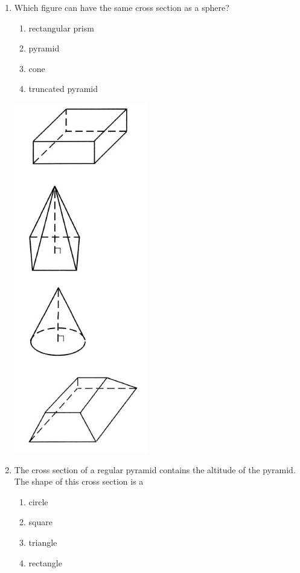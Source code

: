 \documentclass[12pt, oneside]{article}
\begin{document}
\begin{enumerate}[itemsep=0cm]
\newpage
\item Which figure can have the same cross section as a sphere?
  \begin{multicols}{2}
    \begin{enumerate}
      \item rectangular prism
      \item pyramid
      \item cone
      \item truncated pyramid
    \end{enumerate}
  \includegraphics[scale=0.5]{solids2.png}
  \end{multicols}

\item The cross section of a regular pyramid contains the altitude of the pyramid. The shape of this cross section is a
  \begin{multicols}{2}
    \begin{enumerate}
      \item circle
      \item square
      \item triangle
      \item rectangle
    \end{enumerate}
  \end{multicols}


\end{enumerate}
\end{document}
